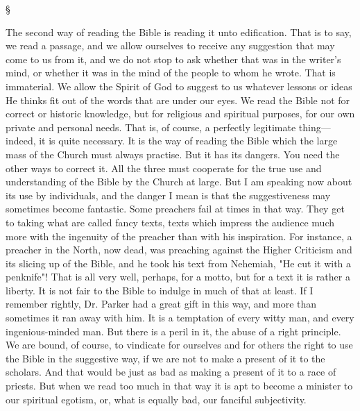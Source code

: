 \documentclass[12pt,a5paper,twoside,titlepage]{book}
\begin{document}
\begin{center}
\S
\end{center}

The second way of reading the Bible is reading 
it unto edification. That is to say, we read 
a passage, and we allow ourselves to receive 
any suggestion that may come to us from it, 
and we do not stop to ask whether that was in 
the writer's mind, or whether it was in the 
mind of the people to whom he wrote. That is 
immaterial. We allow the Spirit of God to 
suggest to us whatever lessons or ideas He 
thinks fit out of the words that are under our 
eyes. We read the Bible not for correct 
or historic knowledge, but for religious and 
spiritual purposes, for our own private and 
personal needs. That is, of course, a perfectly 
legitimate thing---indeed, it is quite necessary. 
It is the way of reading the Bible which the 
large mass of the Church must always practise. 
But it has its dangers. You need the other 
ways to correct it. All the three must cooperate 
for the true use and understanding of 
the Bible by the Church at large. But I am 
speaking now about its use by individuals, 
and the danger I mean is that the suggestiveness
may sometimes become fantastic. Some 
preachers fail at times in that way. They get 
to taking what are called fancy texts, texts 
which impress the audience much more with 
the ingenuity of the preacher than with his 
inspiration. For instance, a preacher in the 
North, now dead, was preaching against the 
Higher Criticism and its slicing up of the 
Bible, and he took his text from Nehemiah, 
"He cut it with a penknife"! That is all very 
well, perhaps, for a motto, but for a text it 
is rather a liberty. It is not fair to the Bible 
to indulge in much of that at least. If I remember 
rightly, Dr. Parker had a great gift in 
this way, and more than sometimes it ran away 
with him. It is a temptation of every witty 
man, and every ingenious-minded man. But 
there is a peril in it, the abuse of a right principle. 
We are bound, of course, to vindicate 
for ourselves and for others the right to use the 
Bible in the suggestive way, if we are not to 
make a present of it to the scholars. And that 
would be just as bad as making a present of it 
to a race of priests. But when we read too 
much in that way it is apt to become a minister 
to our spiritual egotism, or, what is equally bad, 
our fanciful subjectivity. 
\end{document}
